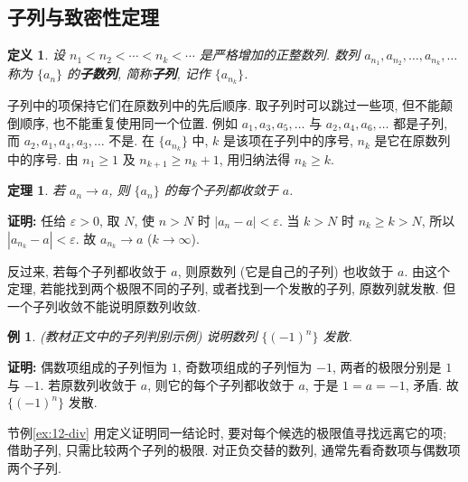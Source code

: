 \documentclass[UTF8,openany]{ctexbook}
\theoremstyle{chinesetextbook}
\newtheorem{definition}{定义}[section]
\newtheorem{example}{例}[section]
\newtheorem{theorem}{定理}[section]
\newenvironment{cnproof}{\par\indent\textbf{证明:} \ignorespaces}{\par}
\begin{document}
\subsection{子列与致密性定理}
\begin{definition}
设 $n_1<n_2<\cdots<n_k<\cdots$ 是严格增加的正整数列. 数列 $a_{n_1},a_{n_2},\ldots,a_{n_k},\ldots$ 称为 $\{a_n\}$ 的\textbf{子数列}, 简称\textbf{子列}, 记作 $\{a_{n_k}\}$.
\end{definition}
子列中的项保持它们在原数列中的先后顺序. 取子列时可以跳过一些项, 但不能颠倒顺序, 也不能重复使用同一个位置. 例如 $a_1,a_3,a_5,\ldots$ 与 $a_2,a_4,a_6,\ldots$ 都是子列, 而 $a_2,a_1,a_4,a_3,\ldots$ 不是. 在 $\{a_{n_k}\}$ 中, $k$ 是该项在子列中的序号, $n_k$ 是它在原数列中的序号. 由 $n_1\ge1$ 及 $n_{k+1}\ge n_k+1$, 用归纳法得 $n_k\ge k$.
\begin{theorem}
若 $a_n\to a$, 则 $\{a_n\}$ 的每个子列都收敛于 $a$.
\end{theorem}
\begin{cnproof}
任给 $\varepsilon>0$, 取 $N$, 使 $n>N$ 时 $|a_n-a|<\varepsilon$. 当 $k>N$ 时 $n_k\ge k>N$, 所以 $|a_{n_k}-a|<\varepsilon$. 故 $a_{n_k}\to a$ ($k\to\infty$).
\end{cnproof}
反过来, 若每个子列都收敛于 $a$, 则原数列 (它是自己的子列) 也收敛于 $a$. 由这个定理, 若能找到两个极限不同的子列, 或者找到一个发散的子列, 原数列就发散. 但一个子列收敛不能说明原数列收敛.
\begin{example}\label{ex:14-sub}
\textnormal{(教材正文中的子列判别示例)} 说明数列 $\{(-1)^n\}$ 发散.
\end{example}
\begin{cnproof}
偶数项组成的子列恒为 $1$, 奇数项组成的子列恒为 $-1$, 两者的极限分别是 $1$ 与 $-1$. 若原数列收敛于 $a$, 则它的每个子列都收敛于 $a$, 于是 $1=a=-1$, 矛盾. 故 $\{(-1)^n\}$ 发散.
\end{cnproof}
1.2 节例\ref{ex:12-div} 用定义证明同一结论时, 要对每个候选的极限值寻找远离它的项; 借助子列, 只需比较两个子列的极限. 对正负交替的数列, 通常先看奇数项与偶数项两个子列.
\end{document}
